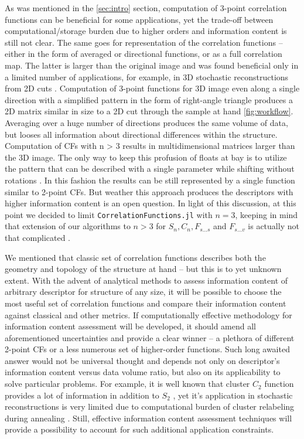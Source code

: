\documentclass[reprint,amsmath,amssymb,aps,pre,showkeys,showpacs]{revtex4-1}
\newcommand{\code}[1]{\colorbox{light-gray}{\texttt{#1}}}
\begin{document}
As was mentioned in the \cref{sec:intro} section, computation of 3-point
correlation functions can be beneficial for some applications, yet the trade-off
between computational/storage burden due to higher orders and information
content is still not clear. The same goes for representation of the correlation
functions -- either in the form of averaged or directional functions, or as a
full correlation map. The latter is larger than the original image and was found
beneficial only in a limited number of applications, for example, in 3D
stochastic reconstructions from 2D cuts
\cite{cherkasov2021adaptive}. Computation of 3-point functions for 3D image even
along a single direction with a simplified pattern in the form of right-angle
triangle produces a 2D matrix similar in size to a 2D cut through the sample at
hand \cref{fig:workflow}. Averaging over a huge number of directions produces
the same volume of data, but looses all information about directional
differences within the structure. Computation of CFs with n > 3 results in
multidimensional matrices larger than the 3D image. The only way to keep this
profusion of floats at bay is to utilize the pattern that can be described with
a single parameter while shifting without rotations
\cite{chen2019hierarchical,chen2022}. In this fashion the results can be still
represented by a single function similar to 2-point CFs. But weather this
approach produces the descriptors with higher information content is an open
question.  In light of this discussion, at this point we decided to limit
\code{CorrelationFunctions.jl} with $n=3$, keeping in mind that extension of our
algorithms to $n>3$ for $S_n, C_n, F_{s...s}$ and $F_{s...v}$ is actually not
that complicated \cite{dimitrakopoulos2010high}.

We mentioned that classic set of correlation functions describes both the
geometry and topology of the structure at hand -- but this is to yet unknown
extent. With the advent of analytical methods \cite{CHERKASOV2024129400} to
assess information content of arbitrary descriptor for structure of any size, it
will be possible to choose the most useful set of correlation functions and
compare their information content against classical and other metrics. If
computationally effective methodology for information content assessment will be
developed, it should amend all aforementioned uncertainties and provide a clear
winner -- a plethora of different 2-point CFs or a less numerous set of
higher-order functions. Such long awaited answer would not be universal thought
and depends not only on descriptor's information content versus data volume
ratio, but also on its applicability to solve particular problems. For example,
it is well known that cluster $C_2$ function provides a lot of information in
addition to $S_2$ \cite{JiaoPNAS}, yet it's application in stochastic
reconstructions is very limited due to computational burden of cluster
relabeling during annealing \cite{PLoS_ONE}. Still, effective information
content assessment techniques will provide a possibility to account for such
additional application constraints.
\end{document}

